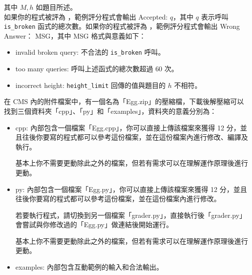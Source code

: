 其中 $M,h$ 如題目所述。\\

如果你的程式被評為 ，範例評分程式會輸出 Accepted: $q$，其中 $q$ 表示呼叫 \texttt{is\_broken} 函式的總次數。如果你的程式被評為 ，範例評分程式會輸出 Wrong Answer： MSG，其中 MSG 格式與意義如下：

\begin{itemize}
    \item invalid broken query: 不合法的 \texttt{is\_broken} 呼叫。
    \item too many queries: 呼叫上述函式的總次數超過 $60$ 次。
    \item incorrect height: \texttt{height\_limit} 回傳的值與題目的 $h$ 不相符。
\end{itemize}

在 CMS 內的附件檔案中，有一個名為「Egg.zip」的壓縮檔，下載後解壓縮可以找到三個資料夾「cpp」、「py」和「examples」，資料夾的意義分別為：

\begin{itemize}
    \item cpp: 內部包含一個檔案「Egg.cpp」，你可以直接上傳該檔案來獲得 12 分，並且往後你要寫的程式都可以參考這份檔案，並在這份檔案內進行修改、編譯及執行。


基本上你不需要更動除此之外的檔案，但若有需求可以在理解運作原理後進行更動。

    \item py: 內部包含一個檔案「Egg.py」，你可以直接上傳該檔案來獲得 12 分，並且往後你要寫的程式都可以參考這份檔案，並在這份檔案內進行修改。

若要執行程式，請切換到另一個檔案「grader.py」，直接執行後「grader.py」會嘗試與你修改過的「Egg.py」做連結後開始運行。

基本上你不需要更動除此之外的檔案，但若有需求可以在理解運作原理後進行更動。

    \item examples: 內部包含互動範例的輸入和合法輸出。
\end{itemize}



